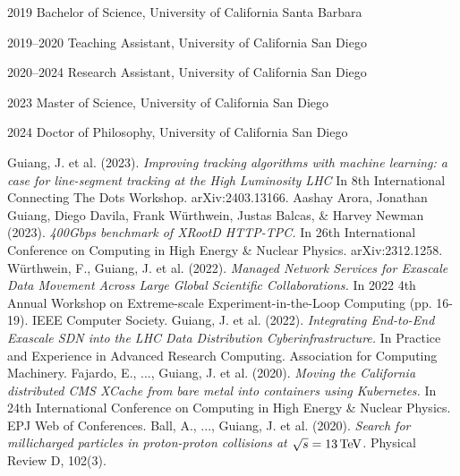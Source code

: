 \begin{vita}
\noindent
\begin{cv}{}
\begin{cvlist}{}
\item[2019] Bachelor of Science, University of California Santa Barbara
\item[2019--2020] Teaching Assistant, University of California San Diego
\item[2020--2024] Research Assistant, University of California San Diego
\item[2023] Master of Science, University of California San Diego
\item[2024] Doctor of Philosophy, University of California San Diego
\end{cvlist}
\end{cv}

\publications
\noindent Guiang, J. et al. (2023). 
\textit{Improving tracking algorithms with machine learning: a case for line-segment tracking at the High Luminosity LHC}
In 8th International Connecting The Dots Workshop. arXiv:2403.13166.
\newline
\newline
\noindent Aashay Arora, Jonathan Guiang, Diego Davila, Frank W\"{u}rthwein, Justas Balcas, \& Harvey Newman (2023). 
\textit{400Gbps benchmark of XRootD HTTP-TPC.}
In 26th International Conference on Computing in High Energy \& Nuclear Physics. arXiv:2312.1258.
\newline
\newline
\noindent W\"{u}rthwein, F., Guiang, J. et al. (2022). 
\textit{Managed Network Services for Exascale Data Movement Across Large Global Scientific Collaborations.}
In 2022 4th Annual Workshop on Extreme-scale Experiment-in-the-Loop Computing (pp. 16-19). IEEE Computer Society.
\newline
\newline
\noindent Guiang, J. et al. (2022). 
\textit{Integrating End-to-End Exascale SDN into the LHC Data Distribution Cyberinfrastructure.}
In Practice and Experience in Advanced Research Computing. Association for Computing Machinery.
\newline
\newline
\noindent Fajardo, E., ..., Guiang, J. et al. (2020). 
\textit{Moving the California distributed CMS XCache from bare metal into containers using Kubernetes.}
In 24th International Conference on Computing in High Energy \& Nuclear Physics. EPJ Web of Conferences.
\newline
\newline
\noindent Ball, A., ..., Guiang, J. et al. (2020). 
\textit{Search for millicharged particles in proton-proton collisions at $\sqrt{s} = 13\,\text{Te\hspace{-.08em}V}$.}
Physical Review D, 102(3).
\end{vita}

